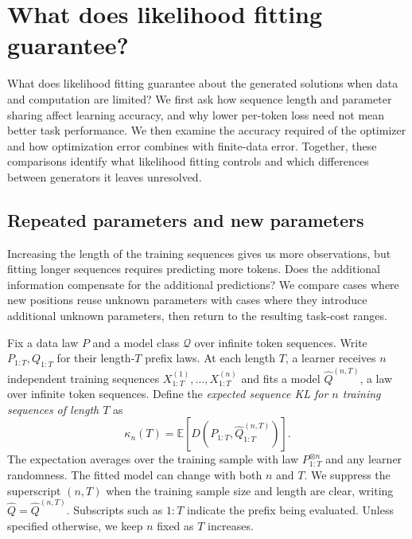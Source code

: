 \documentclass[11pt,twoside]{article}
\newcommand{\E}{\mathbb E}
\newcommand{\KL}{D}
\theoremstyle{definition}
\theoremstyle{remark}
\begin{document}
\section{What does likelihood fitting guarantee?}
\label{sec:growing-horizon}

What does likelihood fitting guarantee about the generated solutions
when data and computation are limited? We first ask how sequence length
and parameter sharing affect learning accuracy, and why lower per-token
loss need not mean better task performance. We then examine the accuracy
required of the optimizer and how optimization error combines with
finite-data error. Together, these comparisons identify what likelihood
fitting controls and which differences between generators it leaves
unresolved.

\subsection{Repeated parameters and new parameters}
\label{sec:parameter-sharing}

Increasing the length of the training sequences gives us more
observations, but fitting longer sequences requires predicting more
tokens. Does the additional information compensate for the additional
predictions? We compare cases where new positions reuse unknown
parameters with cases where they introduce additional unknown parameters,
then return to the resulting task-cost ranges.

Fix a data law \(P\) and a model class \(\mathcal Q\) over infinite
token sequences. Write \(P_{1:T},Q_{1:T}\) for their length-\(T\)
prefix laws. At each length \(T\), a learner receives \(n\) independent
training sequences \(X^{(1)}_{1:T},\ldots,X^{(n)}_{1:T}\) and fits
a model \(\widehat Q^{(n,T)}\), a law over infinite token sequences.
Define the \emph{expected sequence KL for $n$ training sequences of
length $T$} as
\begin{equation}
 \kappa_n(T)=\E\!\left[
 \KL(P_{1:T},\widehat Q_{1:T}^{(n,T)})\right].
 \label{eq:expected-sequence-kl}
\end{equation}
The expectation averages over the training sample with law
\(P_{1:T}^{\otimes n}\) and any learner randomness.
The fitted model can change with both \(n\) and \(T\).
We suppress the superscript \((n,T)\) when the training sample size
and length are clear, writing \(\widehat Q=\widehat Q^{(n,T)}\).
Subscripts such as \(1:T\) indicate the prefix being evaluated.
Unless specified otherwise, we keep \(n\) fixed as \(T\) increases.
\end{document}
